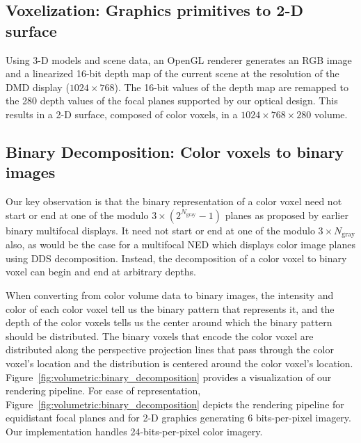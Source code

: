 
\subsection{Voxelization: Graphics primitives to 2-D surface}
\label{sec:volumetric:Voxelization}
Using 3-D models and scene data, an OpenGL renderer generates an RGB image and a linearized 16-bit depth map of the current scene at the resolution of the DMD display ($1024 \times 768$). The 16-bit values of the depth map are remapped to the 280 depth values of the focal planes supported by our optical design. This results in a 2-D surface, composed of color voxels, in a $1024 \times 768 \times 280$ volume.

\subsection{Binary Decomposition: Color voxels to binary images}
\label{sec:volumetric:Decomposition}

Our key observation is that the binary representation of a color voxel need not start or end at one of the modulo $3 \times (2^{N_{\text{gray}}} - 1)$ planes as proposed by earlier binary multifocal displays. It need not start or end at one of the modulo $3 \times N_{\text{gray}}$ also, as would be the case for a multifocal NED which displays color image planes using DDS decomposition. Instead, the decomposition of a color voxel to binary voxel can begin and end at arbitrary depths. 

When converting from color volume data to binary images, the intensity and color of each color voxel tell us the binary pattern that represents it, and the depth of the color voxels tells us the center around which the binary pattern should be distributed. The binary voxels that encode the color voxel are distributed along the perspective projection lines that pass through the color voxel's location and the distribution is centered around the color voxel's location. Figure~\ref{fig:volumetric:binary_decomposition} provides a visualization of our rendering pipeline. For ease of representation, Figure~\ref{fig:volumetric:binary_decomposition} depicts the rendering pipeline for equidistant focal planes and for 2-D graphics generating 6 bits-per-pixel imagery. Our implementation handles 24-bits-per-pixel color imagery.


